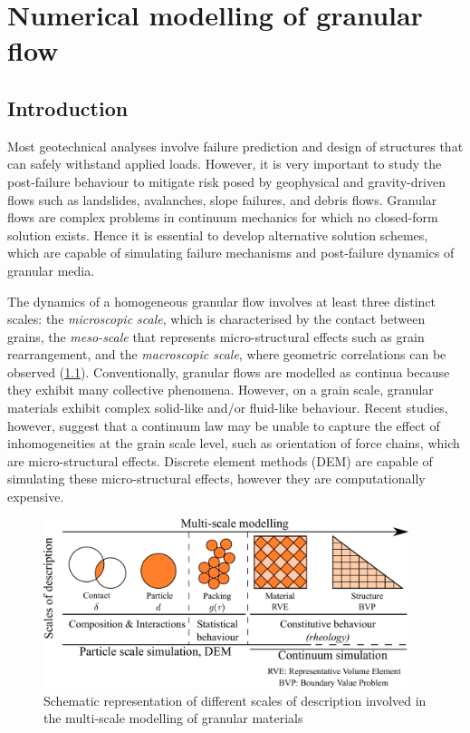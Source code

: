 \chapter{Numerical modelling of granular flow}

\ifpdf
    \graphicspath{{Chapter3/figs/raster/}{Chapter3/figs/pdf/}{Chapter3/figs/}}
\else
    \graphicspath{{Chapter3/figs/vector/}{Chapter3/figs/}}
\fi
\label{chapter:numerical_modelling}
\section{Introduction}

Most geotechnical analyses involve failure prediction and design of 
structures that can safely withstand applied loads. However, it is very 
important to study the post-failure behaviour to mitigate risk posed by 
geophysical and gravity-driven flows such as landslides, avalanches, slope 
failures, and debris flows. Granular flows are complex problems in continuum 
mechanics for which no closed-form solution exists. Hence it is essential to 
develop alternative solution schemes, which are capable of simulating failure 
mechanisms and post-failure dynamics of granular media. 

The dynamics of a homogeneous granular flow involves at least three distinct 
scales: the \textit{microscopic scale}, which is characterised by the contact 
between grains, the \textit{meso-scale} that represents micro-structural 
effects such as grain rearrangement, and the \textit{macroscopic scale}, where 
geometric correlations can be observed (\cref{fig:multiscale}). Conventionally, 
granular flows are modelled as continua because they exhibit many collective 
phenomena. However, on a grain scale, granular materials exhibit complex 
solid-like and/or fluid-like behaviour. Recent studies, however, suggest that a 
continuum law may be unable to capture the effect of inhomogeneities at the 
grain scale level, such as orientation of force chains, which are 
micro-structural effects. Discrete element methods (DEM) are capable of 
simulating these micro-structural effects, however they are computationally 
expensive. 

\begin{figure}[tbhp]
\centering
\includegraphics[width=0.95\textwidth]{multiscale}
\caption{Schematic representation of different scales of description involved 
in the multi-scale modelling of granular materials}
\label{fig:multiscale}
\end{figure}


